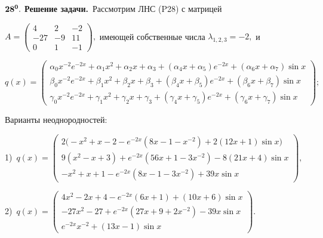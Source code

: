 \documentclass[11pt]{article}
\begin{document}
\medskip
${\bf 28^0.}$ 
{\bf Решение задачи.}\, Рассмотрим ЛНС (P28) с матрицей 

\smallskip %
$A=\begin{pmatrix} 4&2&-2\\ -27&-9&11\\ 0&1&-1 \end{pmatrix},$ имеющей собственные числа $\lambda_{1,2,3}=-2,$ и %

\smallskip %
$q(x) =  \begin{pmatrix}
\alpha_0 x^{-2}e^{-2x} + \alpha_1 x^2 + \alpha_2 x + \alpha_3 + (\alpha_4 x + \alpha_5)e^{-2x} + (\alpha_6 x + \alpha_7) \sin x \\
\beta_0  x^{-2}e^{-2x} + \beta_1 x^2 + \beta_2 x  + \beta_3 +   (\beta_4 x + \beta_5)e^{-2x}   + (\beta_6 x + \beta_7) \sin x   \\
\gamma_0 x^{-2}e^{-2x} + \gamma_1 x^2 + \gamma_2 x + \gamma_3 + (\gamma_4 x + \gamma_5)e^{-2x} + (\gamma_6 x + \gamma_7) \sin x 
\end{pmatrix};$ 

\smallskip %
Варианты неоднородностей:

1)\ $q(x) = \begin{pmatrix}
2\big(-x^{2} + x - 2 - e^{-2x}(8x - 1 - x^{-2}) + 2(12x+1)\sin x\big) \\
9(x^2 - x + 3) + e^{-2x}(56x + 1 - 3x^{-2}) - 8(21x+4)\sin x \\
-x^2 + x + 1 - e^{-2x}(8x - 1 - 3x^{-2}) + 39x\sin x
\end{pmatrix}, $ 

2)\ $q(x) = \begin{pmatrix}
4x^{2} - 2x + 4 - e^{-2x}(6x + 1) + (10x+6)\sin x \\
-27x^2 - 27 + e^{-2x}(27x + 9 + 2x^{-2}) - 39x \sin x\\
e^{-2x}x^{-2} + (13 x - 1) \sin x
\end{pmatrix}.$
\end{document}
